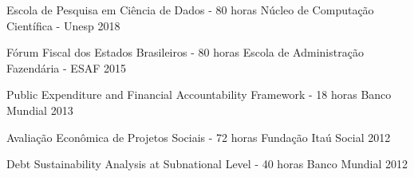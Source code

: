 \begin{cvhonors}

  \cvhonor
    {Escola de Pesquisa em Ciência de Dados - 80 horas}
    {Núcleo de Computação Científica - Unesp}
    {}
    {2018}
 
  \cvhonor
    {Fórum Fiscal dos Estados Brasileiros - 80 horas}
    {Escola de Administração Fazendária - ESAF}
    {}
    {2015}

  \cvhonor
    {Public Expenditure and Financial Accountability Framework - 18 horas}
    {Banco Mundial}
    {}
    {2013}

  \cvhonor
    {Avaliação Econômica de Projetos Sociais - 72 horas}
    {Fundação Itaú Social}
    {}
    {2012}

\cvhonor
    {Debt Sustainability Analysis at Subnational Level - 40 horas}
    {Banco Mundial}
    {}
    {2012}

\end{cvhonors}